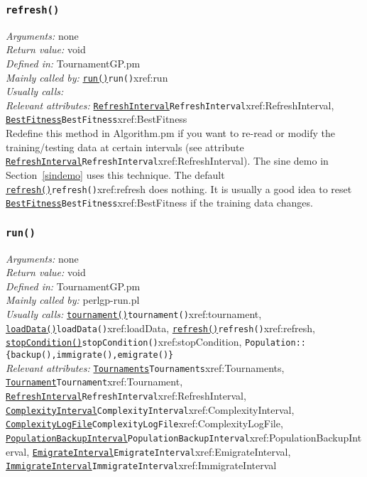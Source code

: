 \documentclass[a4paper]{article}
\begin{document}
\subsubsection{\texttt{refresh()}}\label{xref:refresh}
\textit{Arguments:} none\\
\textit{Return value:} void\\
\textit{Defined in:} TournamentGP.pm\\
\textit{Mainly called by:} \hyperref[no]{\texttt{run()}}{\texttt{run()}}{xref:run}\\
\textit{Usually calls:} \\
\textit{Relevant attributes:} \hyperref[no]{\texttt{RefreshInterval}}{\texttt{RefreshInterval}}{xref:RefreshInterval}, \hyperref[no]{\texttt{BestFitness}}{\texttt{BestFitness}}{xref:BestFitness}\\

Redefine this method in Algorithm.pm if you want to re-read or modify
the training/testing data at certain intervals (see attribute
\hyperref[no]{\texttt{RefreshInterval}}{\texttt{RefreshInterval}}{xref:RefreshInterval}).  The sine demo in Section~\ref{sindemo}
uses this technique.  The default \hyperref[no]{\texttt{refresh()}}{\texttt{refresh()}}{xref:refresh} does nothing.  It
is usually a good idea to reset \hyperref[no]{\texttt{BestFitness}}{\texttt{BestFitness}}{xref:BestFitness} if the training
data changes.

\subsubsection{\texttt{run()}}\label{xref:run}
\begin{flushleft}
\textit{Arguments:} none\\
\textit{Return value:} void\\
\textit{Defined in:} TournamentGP.pm\\
\textit{Mainly called by:} perlgp-run.pl\\
\textit{Usually calls:} \hyperref[no]{\texttt{tournament()}}{\texttt{tournament()}}{xref:tournament}, \hyperref[no]{\texttt{loadData()}}{\texttt{loadData()}}{xref:loadData}, \hyperref[no]{\texttt{refresh()}}{\texttt{refresh()}}{xref:refresh}, \hyperref[no]{\texttt{stopCondition()}}{\texttt{stopCondition()}}{xref:stopCondition}, \texttt{Population::\{backup(),immigrate(),emigrate()\}}\\
\textit{Relevant attributes:} \hyperref[no]{\texttt{Tournaments}}{\texttt{Tournaments}}{xref:Tournaments}, \hyperref[no]{\texttt{Tournament}}{\texttt{Tournament}}{xref:Tournament}, \hyperref[no]{\texttt{RefreshInterval}}{\texttt{RefreshInterval}}{xref:RefreshInterval}, \hyperref[no]{\texttt{ComplexityInterval}}{\texttt{ComplexityInterval}}{xref:ComplexityInterval}, \hyperref[no]{\texttt{ComplexityLogFile}}{\texttt{ComplexityLogFile}}{xref:ComplexityLogFile}, \hyperref[no]{\texttt{PopulationBackupInterval}}{\texttt{PopulationBackupInterval}}{xref:PopulationBackupInterval}, \hyperref[no]{\texttt{EmigrateInterval}}{\texttt{EmigrateInterval}}{xref:EmigrateInterval}, \hyperref[no]{\texttt{ImmigrateInterval}}{\texttt{ImmigrateInterval}}{xref:ImmigrateInterval}
\end{flushleft}
\end{document}
